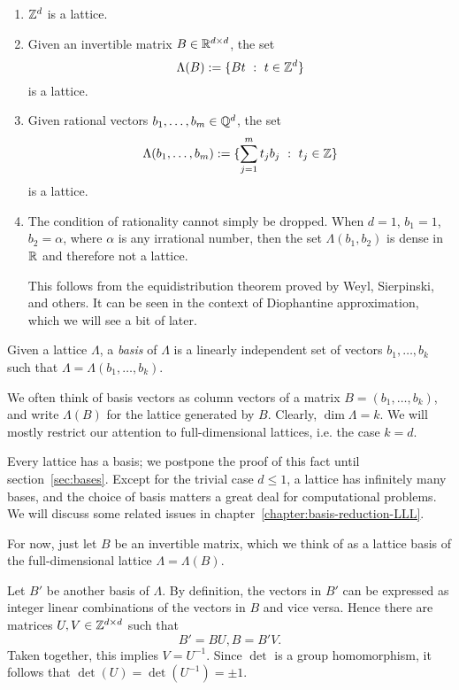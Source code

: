 \begin{example}
  \begin{enumerate}
    \item $\mathbb{Z}^d$ is a lattice.

    \item Given an invertible matrix $B \in \mathbb{R}^{d \times d}$, the set
      \[ \Lambda(B) := \{ B t ~:~ t \in \mathbb{Z}^d \} \]
      is a lattice.

    \item Given rational vectors $b_1, \ldots, b_m \in \mathbb{Q}^d$, the set
      \[ \Lambda(b_1, \ldots, b_m) := \{ \sum_{j=1}^m t_j b_j ~:~ t_j \in \mathbb{Z} \} \]
      is a lattice.

    \item The condition of rationality cannot simply be dropped.
      When $d = 1$, $b_1 = 1$, $b_2 = \alpha$, where $\alpha$ is any irrational number,
      then the set $\Lambda(b_1, b_2)$ is dense in $\mathbb{R}$ and therefore not a lattice.

      This follows from the equidistribution theorem proved by Weyl, Sierpinski, and others.
      It can be seen in the context of Diophantine approximation, which we will see a bit of later.
  \end{enumerate}
\end{example}

\begin{definition}
  Given a lattice $\Lambda$,
  a \emph{basis} of $\Lambda$ is a linearly independent set of vectors $b_1, \ldots, b_k$
  such that $\Lambda = \Lambda(b_1, \ldots, b_k)$.
\end{definition}

We often think of basis vectors as column vectors of a matrix $B = (b_1, \ldots, b_k)$,
and write $\Lambda(B)$ for the lattice generated by $B$.
Clearly, $\dim\Lambda = k$.
We will mostly restrict our attention to full-dimensional lattices, i.e. the case $k = d$.

Every lattice has a basis; we postpone the proof of this fact until section~\ref{sec:bases}.
Except for the trivial case $d \leq 1$, a lattice has infinitely many bases,
and the choice of basis matters a great deal for computational problems.
We will discuss some related issues in chapter~\ref{chapter:basis-reduction-LLL}.

For now, just let $B$ be an invertible matrix,
which we think of as a lattice basis of the full-dimensional lattice $\Lambda = \Lambda(B)$.

Let $B'$ be another basis of $\Lambda$.
By definition, the vectors in $B'$ can be expressed as integer linear combinations of the vectors in $B$
and vice versa. Hence there are matrices $U, V \in \mathbb{Z}^{d \times d}$ such that
\[ B' = BU, B = B'V. \]
Taken together, this implies $V = U^{-1}$.
Since $\det$ is a group homomorphism, it follows that $\det(U) = \det(U^{-1}) = \pm 1$.

